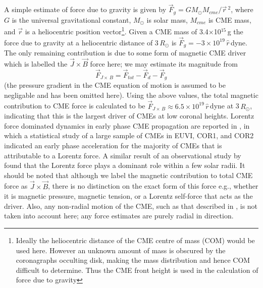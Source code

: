 \documentclass{emulateapj}
\begin{document}
A simple estimate of force due to gravity is given by $\vec{F}_{g}=GM_{\odot}M_{cme}/\vec{r}\,^2$, where $G$ is the universal gravitational constant, $M_{\odot}$ is solar mass, $M_{cme}$ is CME mass, and $\vec{r}$ is a heliocentric position vector\footnote{Ideally the heliocentric distance of the CME centre of mass (COM) would be used here. However an unknown amount of mass is obscured by the coronagraphs occulting disk, making the mass distribution and hence COM difficult to determine. Thus the CME front height is used in the calculation of force due to gravity}. Given a CME mass of 3.4$\times$10$^{15}$\,g the force due to gravity at a heliocentric distance of 3\,$R_{\odot}$ is $\vec{F}_{g}=-3\times10^{19}\,\hat{r}$\,dyne. The only remaining contribution is due to some form of magnetic CME driver which is labelled the $\vec{J}\times\vec{B}$ force here; we may estimate its magnitude from 
\begin{equation}
\vec{F}_{J\times\,B}= \vec{F}_{tot}-\vec{F}_{d}-\vec{F}_{g}
\end{equation}
(the pressure gradient in the CME equation of motion is assumed to be negligable and has been omitted here). Using the above values, the total magnetic contribution to CME force is calculated to be $\vec{F}_{J\times\,B}\approx6.5\times10^{19}\,\hat{r}$\,dyne at 3\,$R_{\odot}$, indicating that this is the largest driver of CMEs at low coronal heights. Lorentz force dominated dynamics in early phase CME propagation are reported in \citet{bein2011}, in which a statistical study of a large sample of CMEs in EUVI, COR1, and COR2 indicated an early phase acceleration for the majority of CMEs that is attributable to a Lorentz force.  A similar result of an observational study by \citet{vrs06} found that the Lorentz force plays a dominant role within a few solar radii. It should be noted that although we label the magnetic contribution to total CME force as $\vec{J}\times\vec{B}$, there is no distinction on the exact form of this force e.g., whether it is magnetic pressure, magnetic tension, or a Lorentz self-force that acts as the driver.  Also, any non-radial motion of the CME, such as that described in \citet{byr10}, is not taken into account here; any force estimates are purely radial in direction.

 
\end{document}
